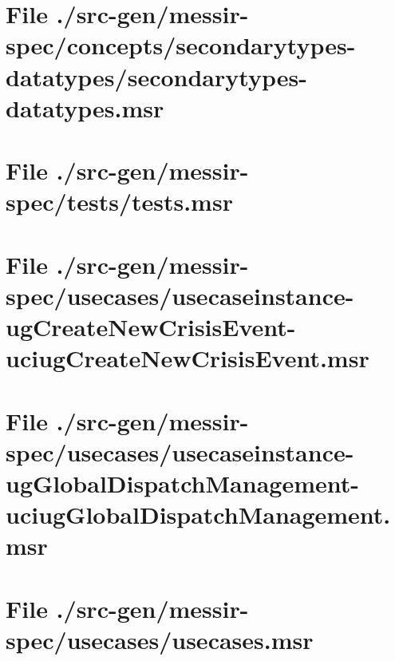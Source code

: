 \section[File /src-gen/messir-spec/concepts.../secondarytypes-datatypes.msr]{File ./src-gen/messir-spec/concepts/secondarytypes-datatypes/secondarytypes-datatypes.msr}
\scriptsize

\normalsize
	
\section[File /src-gen/messir-spec/tests/tests.msr]{File ./src-gen/messir-spec/tests/tests.msr}
\scriptsize

\normalsize
	
\section[File /.../usecaseinstance-ugCreateNewCrisisEvent-uciugCreateNewCrisisEvent.msr]{File ./src-gen/messir-spec/usecases/usecaseinstance-ugCreateNewCrisisEvent-uciugCreateNewCrisisEvent.msr}
\scriptsize

\normalsize
	
\section[File /.../usecaseinstance-ugGlobalDispatchManagement-uciugGlobalDispatchManagement.msr]{File ./src-gen/messir-spec/usecases/usecaseinstance-ugGlobalDispatchManagement-uciugGlobalDispatchManagement.msr}
\scriptsize

\normalsize
	
\section[File /src-gen/messir-spec/usecases/usecases.msr]{File ./src-gen/messir-spec/usecases/usecases.msr}
\scriptsize

\normalsize
	
